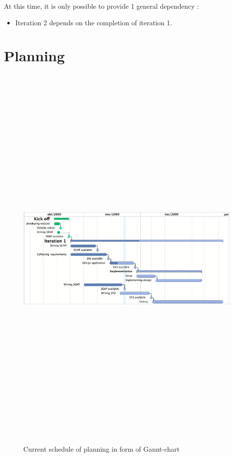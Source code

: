 \documentclass[a4paper, 12pt]{report}
\begin{document}
			At this time, it is only possible to provide 1 general dependency :
			
			\begin{itemize}
				
				\item Iteration 2 depends on the completion of iteration 1.
				
			\end{itemize}
			
			
			\section{Planning}	
				\label{planning}
			\begin{figure}
				\includegraphics[angle=90, height=20cm]{../../img/gannt-v0_2.jpg}
				\caption{Current schedule of planning in form of Gannt-chart}
			\end{figure}
			
			
	
\end{document}
